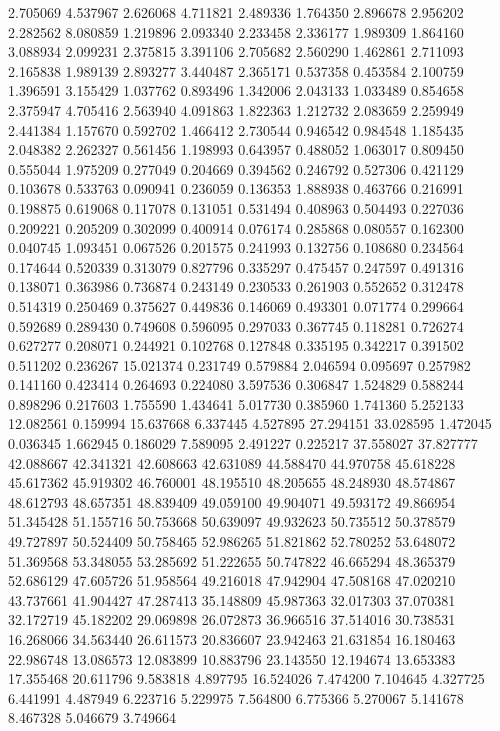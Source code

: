 2.705069
4.537967
2.626068
4.711821
2.489336
1.764350
2.896678
2.956202
2.282562
8.080859
1.219896
2.093340
2.233458
2.336177
1.989309
1.864160
3.088934
2.099231
2.375815
3.391106
2.705682
2.560290
1.462861
2.711093
2.165838
1.989139
2.893277
3.440487
2.365171
0.537358
0.453584
2.100759
1.396591
3.155429
1.037762
0.893496
1.342006
2.043133
1.033489
0.854658
2.375947
4.705416
2.563940
4.091863
1.822363
1.212732
2.083659
2.259949
2.441384
1.157670
0.592702
1.466412
2.730544
0.946542
0.984548
1.185435
2.048382
2.262327
0.561456
1.198993
0.643957
0.488052
1.063017
0.809450
0.555044
1.975209
0.277049
0.204669
0.394562
0.246792
0.527306
0.421129
0.103678
0.533763
0.090941
0.236059
0.136353
1.888938
0.463766
0.216991
0.198875
0.619068
0.117078
0.131051
0.531494
0.408963
0.504493
0.227036
0.209221
0.205209
0.302099
0.400914
0.076174
0.285868
0.080557
0.162300
0.040745
1.093451
0.067526
0.201575
0.241993
0.132756
0.108680
0.234564
0.174644
0.520339
0.313079
0.827796
0.335297
0.475457
0.247597
0.491316
0.138071
0.363986
0.736874
0.243149
0.230533
0.261903
0.552652
0.312478
0.514319
0.250469
0.375627
0.449836
0.146069
0.493301
0.071774
0.299664
0.592689
0.289430
0.749608
0.596095
0.297033
0.367745
0.118281
0.726274
0.627277
0.208071
0.244921
0.102768
0.127848
0.335195
0.342217
0.391502
0.511202
0.236267
15.021374
0.231749
0.579884
2.046594
0.095697
0.257982
0.141160
0.423414
0.264693
0.224080
3.597536
0.306847
1.524829
0.588244
0.898296
0.217603
1.755590
1.434641
5.017730
0.385960
1.741360
5.252133
12.082561
0.159994
15.637668
6.337445
4.527895
27.294151
33.028595
1.472045
0.036345
1.662945
0.186029
7.589095
2.491227
0.225217
37.558027
37.827777
42.088667
42.341321
42.608663
42.631089
44.588470
44.970758
45.618228
45.617362
45.919302
46.760001
48.195510
48.205655
48.248930
48.574867
48.612793
48.657351
48.839409
49.059100
49.904071
49.593172
49.866954
51.345428
51.155716
50.753668
50.639097
49.932623
50.735512
50.378579
49.727897
50.524409
50.758465
52.986265
51.821862
52.780252
53.648072
51.369568
53.348055
53.285692
51.222655
50.747822
46.665294
48.365379
52.686129
47.605726
51.958564
49.216018
47.942904
47.508168
47.020210
43.737661
41.904427
47.287413
35.148809
45.987363
32.017303
37.070381
32.172719
45.182202
29.069898
26.072873
36.966516
37.514016
30.738531
16.268066
34.563440
26.611573
20.836607
23.942463
21.631854
16.180463
22.986748
13.086573
12.083899
10.883796
23.143550
12.194674
13.653383
17.355468
20.611796
9.583818
4.897795
16.524026
7.474200
7.104645
4.327725
6.441991
4.487949
6.223716
5.229975
7.564800
6.775366
5.270067
5.141678
8.467328
5.046679
3.749664
